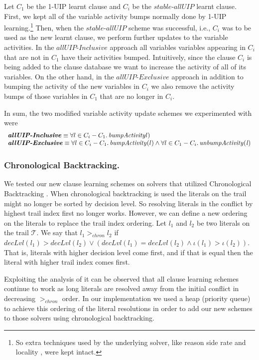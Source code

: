 \documentclass[runningheads]{llncs}
\newcommand{\allUip}{\textit{stable-allUIP}}
\newcommand{\allUipIn}{\textit{allUIP-Inclusive}}
\newcommand{\allUipEx}{\textit{allUIP-Exclusive}}
\newcommand{\trail}{\ensuremath{\mathcal{T}}}
\newcommand{\trailIdx}[1]{\ensuremath{\iota(#1)}}
\newcommand{\dlevel}[1]{\ensuremath{\mathit{decLvl}(#1)}}
\begin{document}
Let $C_1$ be the 1-UIP learnt clause and $C_i$ be the $\allUip$ learnt
clause. First, we kept all of the variable activity bumps normally
done by 1-UIP learning.\footnote{So extra techniques used by the
  underlying solver, like reason side rate and locality
  \cite{DBLP:conf/sat/LiangGPC16}, were kept intact.}  Then, when the
$\allUip$ scheme was successful, i.e., $C_i$ was to be used as the new
learnt clause, we perform further updates to the variable
activities. In the $\allUipIn$ approach all variables variables
appearing in $C_i$ that are not in $C_1$ have their activities
bumped. Intuitively, since the clause $C_i$ is being added to the
clause database we want to increase the activity of all of its
variables. On the other hand, in the $\allUipEx$ approach in addition
to bumping the activity of the new variables in $C_i$ we also remove
the activity bumps of those variables in $C_1$ that are no longer in
$C_i$.

In sum, the two modified variable activity update schemes we
experimented with were
\[
    \begin{array}{l}
    \textbf{\allUipIn} \equiv \forall l\in C_i - C_1.\,\mathit{bumpActivity}l) \\
    \textbf{\allUipEx} \equiv \forall l\in C_i - C_1.\,\mathit{bumpActivity}(l) \land 
    \forall l\in C_1 - C_i.\,\mathit{unbumpActivity(l)}
  \end{array}
\]

\subsubsection{Chronological Backtracking.}
We tested our new clause learning schemes on solvers that utilized
Chronological Backtracking
\cite{DBLP:conf/sat/NadelR18,DBLP:conf/sat/MohleB19}. When
chronological backtracking is used the literals on the trail might no
longer be sorted by decision level. So resolving literals in the
conflict by highest trail index first no longer works. However, we can
define a new ordering on the literals to replace the trail index
ordering. Let $l_1$ and $l_2$ be two literals on the trail
$\trail$. We say that $l_1 >_{\mathit{chron}} l_2$ if
$\dlevel{l_1} > \dlevel{l_2} \lor (\dlevel{l_1} = \dlevel{l_2} \land
\trailIdx{l_1} > \trailIdx{l_2})$. That is, literals with higher
decision level come first, and if that is equal then the literal with
higher trail index comes first.

Exploiting the analysis of \cite{DBLP:conf/sat/MohleB19} it can be
observed that all clause learning schemes continue to work as long
literals are resolved away from the initial conflict in decreasing
$>_{\mathit{chron}}$ order. In our implementation we used a heap
(priority queue) to achieve this ordering of the literal resolutions
in order to add our new schemes to those solvers using chronological
backtracking.
\end{document}
